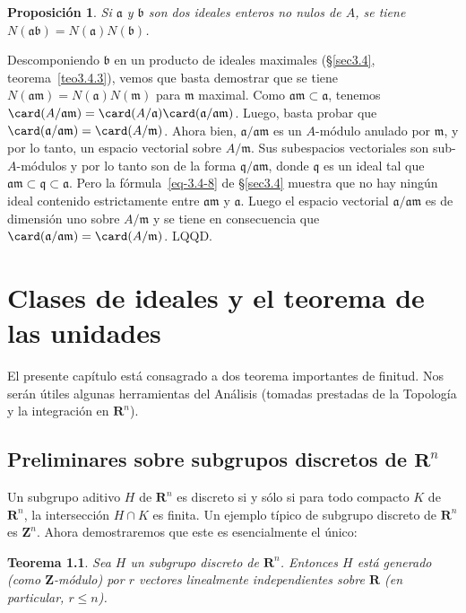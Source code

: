 \documentclass[bibtotoc,leqno,spanish]{amsbook}
\newcommand{\RR}{\mathbf{R}}
\newcommand{\ZZ}{\mathbf{Z}}
\newcommand{\idl}[1]{\mathfrak{#1}}
\newcommand{\QED}{LQQD.}
\numberwithin{equation}{section}
\theoremstyle{note}
\theoremstyle{note}
\newtheorem{theorem}{Teorema}
\newtheorem{proposition}{Proposici\'on}
\theoremstyle{rem}
\numberwithin{theorem}{section}
\numberwithin{proposition}{section}
\numberwithin{definition}{section}
\numberwithin{lemma}{section}
\numberwithin{corollary}{section}
\numberwithin{example}{section}
\numberwithin{footnote}{section}%
\begin{document}
\begin{proposition}\label{prop3.5.2}
Si $\idl{a}$ y $\idl{b}$ son dos ideales enteros no nulos de $A$, se tiene
$N(\idl{a}\idl{b}) = N(\idl{a})N(\idl{b})$.
\end{proposition}

Descomponiendo $\idl{b}$ en un producto de ideales maximales (\S\ref{sec3.4}, teorema~\ref{teo3.4.3}), vemos que
basta demostrar que se tiene $N(\idl{a}\idl{m}) = N(\idl{a})N(\idl{m})$ para $\idl{m}$ maximal.
Como $\idl{a}\idl{m}\subset\idl{a}$, tenemos $\card(A/\idl{a}\idl{m}) =
\card(A/\idl{a})\card(\idl{a}/\idl{a}\idl{m})$. Luego, basta probar que $\card(\idl{a}/\idl{a}\idl{m})
=\card(A/\idl{m})$. Ahora bien, $\idl{a}/\idl{a}\idl{m}$ es un $A$-m\'odulo anulado por $\idl{m}$, y por
lo tanto, un espacio vectorial sobre $A/\idl{m}$. Sus subespacios vectoriales son sub-$A$-m\'odulos y por
lo tanto son de la forma $\idl{q}/\idl{a}\idl{m}$, donde $\idl{q}$ es un ideal tal que
$\idl{a}\idl{m}\subset\idl{q}\subset\idl{a}$. Pero la f\'ormula~\eqref{eq-3.4-8} de \S\ref{sec3.4}
muestra que no hay
ning\'un ideal contenido estrictamente entre $\idl{a}\idl{m}$ y $\idl{a}$. Luego el espacio vectorial
$\idl{a}/\idl{a}\idl{m}$ es de dimensi\'on uno sobre $A/\idl{m}$ y se tiene en consecuencia que
$\card(\idl{a}/\idl{a}\idl{m}) = \card(A/\idl{m})$. \QED

\chapter{Clases de ideales y el teorema de las unidades}\label{cap4}

El presente cap\'itulo est\'a consagrado a dos teorema importantes de finitud. Nos ser\'an
\'utiles algunas herramientas del An\'alisis (tomadas prestadas de la Topolog\'ia y la integraci\'on
en $\RR^{n}$).

\section{Preliminares sobre subgrupos discretos de $\RR^{n}$}\label{sec4.1}

Un subgrupo aditivo $H$ de $\RR^{n}$ es discreto si y s\'olo si para todo compacto $K$ de $\RR^{n}$,
la intersecci\'on $H\cap K$ es finita. Un ejemplo t\'ipico de subgrupo discreto de $\RR^{n}$ es $\ZZ^{n}$.
Ahora demostraremos que este es esencialmente el \'unico:

\begin{theorem}\label{teo4.1.1}
Sea $H$ un subgrupo discreto de $\RR^{n}$. Entonces $H$ est\'a generado {\upshape(}como $\ZZ$-m\'odulo\/{\upshape)} por
$r$ vectores linealmente independientes sobre $\RR$ {\upshape(}en particular, $r\leq n${\upshape).}
\end{theorem}
\end{document}
